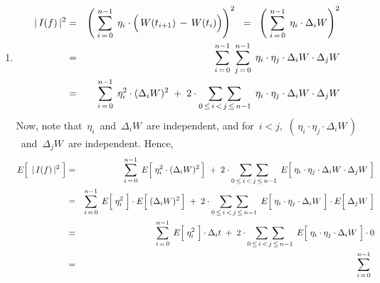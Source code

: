 \begin{enumerate}
\item
	\begin{eqnarray*}
	\vert\, I(f) \,\vert^{2}
	& = &
		\left(\;
			\overset{n-1}{\underset{i\,=\,0}{\sum}}\;\,
			\eta_{i} \cdot \left(\, W(t_{i+1}) \,\overset{{\color{white}.}}{-}\, W(t_{i}) \right)
			\right)^{2}
	\;\; = \;\;
		\left(\;
			\overset{n-1}{\underset{i\,=\,0}{\sum}}\;\,
			\eta_{i} \cdot \Delta_{i}W
			\right)^{2}
	\\
	& = &
		\overset{n-1}{\underset{i\,=\,0}{\sum}}\;\,
		\overset{n-1}{\underset{j\,=\,0}{\sum}}\;\,
		\eta_{i} \cdot \eta_{j} \cdot \Delta_{i}W \cdot \Delta_{j}W
	\\
	& = &
		\overset{n-1}{\underset{i\,=\,0}{\sum}}\;\,
		\eta_{i}^{2} \cdot (\Delta_{i}W)^{2}
		\; + \;
		2 \cdot
		\underset{0 \,\leq\, i \,<\, j \,\leq\, n-1}{\sum\;\sum}\;\,
		\eta_{i} \cdot \eta_{j} \cdot \Delta_{i}W \cdot \Delta_{j}W
	\end{eqnarray*}
	Now, note that \,$\eta_{i}$\, and \,$\Delta_{i}W$\, are independent, and
	for \,$i < j$, \,$(\,\eta_{i}\cdot\eta_{j}\cdot\Delta_{i}W\,)$\, and \,$\Delta_{j}W$\, are independent.
	Hence,
	\begin{eqnarray*}
	E\!\left[\;\, \overset{{\color{white}.}}{\vert\, I(f) \,\vert^{2}} \;\right]
	& = &
		\overset{n-1}{\underset{i\,=\,0}{\sum}}\;\,
		E\!\left[\; \overset{{\color{white}.}}{\eta_{i}^{2}} \cdot (\Delta_{i}W)^{2} \,\right]
		\; + \;
		2 \cdot
		\underset{0 \,\leq\, i \,<\, j \,\leq\, n-1}{\sum\;\sum}\;\,
		E\!\left[\; \overset{{\color{white}1}}{\eta_{i}} \cdot \eta_{j} \cdot \Delta_{i}W \cdot \Delta_{j}W \;\right]
	\\
	& = &
		\overset{n-1}{\underset{i\,=\,0}{\sum}}\;\,
		E\!\left[\; \overset{{\color{white}.}}{\eta_{i}^{2}} \;\right] \cdot E\!\left[\; \overset{{\color{white}.}}{(\Delta_{i}W)^{2}} \,\right]
		\; + \;
		2 \cdot
		\underset{0 \,\leq\, i \,<\, j \,\leq\, n-1}{\sum\;\sum}\;\,
		E\!\left[\; \overset{{\color{white}1}}{\eta_{i}} \cdot \eta_{j} \cdot \Delta_{i}W \;\right]
		\cdot
		E\!\left[\; \overset{{\color{white}.}}{\Delta_{j}W} \;\right]
	\\
	& = &
		\overset{n-1}{\underset{i\,=\,0}{\sum}}\;\,
		E\!\left[\; \overset{{\color{white}.}}{\eta_{i}^{2}} \;\right] \cdot \Delta_{i}t
		\; + \;
		2 \cdot
		\underset{0 \,\leq\, i \,<\, j \,\leq\, n-1}{\sum\;\sum}\;\,
		E\!\left[\; \overset{{\color{white}1}}{\eta_{i}} \cdot \eta_{j} \cdot \Delta_{i}W \;\right]
		\cdot
		0
	\\
	& = &
		\overset{n-1}{\underset{i\,=\,0}{\sum}}\;\,

\end{eqnarray*}
\end{enumerate}
